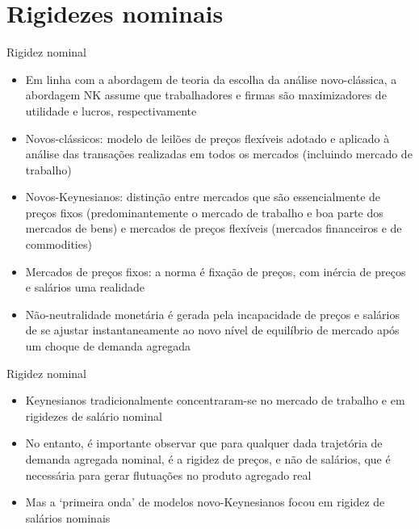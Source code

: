 \documentclass[10pt]{beamer}
\begin{document}
\section{Rigidezes nominais}
\begin{frame}{Rigidez nominal}
    \begin{itemize}
        \item Em linha com a abordagem de teoria da escolha da análise novo-clássica, a abordagem NK assume que trabalhadores e firmas são maximizadores de utilidade e lucros, respectivamente\bigskip
        \item Novos-clássicos: modelo de leilões de preços flexíveis adotado e aplicado à análise das transações realizadas em todos os mercados (incluindo mercado de trabalho)\bigskip
        \item Novos-Keynesianos: distinção entre mercados que são essencialmente de preços fixos (predominantemente o mercado de trabalho e boa parte dos mercados de bens) e mercados de preços flexíveis (mercados financeiros e de commodities)\bigskip
        \item Mercados de preços fixos: a norma é fixação de preços, com inércia de preços e salários uma realidade\bigskip
        \item Não-neutralidade monetária é gerada pela incapacidade de preços e salários de se ajustar instantaneamente ao novo nível de equilíbrio de mercado após um choque de demanda agregada
    \end{itemize}
\end{frame}

\begin{frame}{Rigidez nominal}
    \begin{itemize}
        \item Keynesianos tradicionalmente concentraram-se no mercado de trabalho e em rigidezes de salário nominal\bigskip
        \item No entanto, é importante observar que para qualquer dada trajetória de demanda agregada nominal, é a rigidez de preços, e não de salários, que é necessária para gerar flutuações no produto agregado real\bigskip
        \item Mas a `primeira onda' de modelos novo-Keynesianos focou em rigidez de salários nominais
    \end{itemize}
\end{frame}
\end{document}

